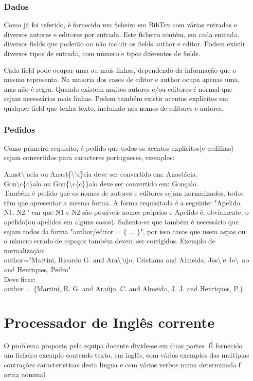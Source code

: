 \documentclass{report}
\begin{document}
\subsubsection{Dados}
Como já foi referido, é fornecido um ficheiro em BibTex com várias entradas 
e diversos autores e editores por entrada. Este ficheiro contém, em 
cada entrada, diversos fields que poderão ou não incluir os fields author 
e editor. Podem existir
diversos tipos de entrada, com número e tipos diferentes de fields.\par
Cada field pode ocupar uma ou mais linhas, dependendo da informação que 
o mesmo representa. Na maioria dos casos de editor
e author ocupa apenas uma, mas não é regra. Quando existem muitos 
autores e/ou editores é normal que sejam necessárias mais linhas. 
Podem também existir acentos explícitos em qualquer field que tenha 
texto, incluindo nos nomes de editores e autores.

\subsubsection{Pedidos}
Como primeiro requisito, é pedido que todos os acentos explícitos(e cedilhas) 
sejam convertidos para caracteres portugueses, exemplos:\par
Anast\textbackslash'acia ou Anast\{\textbackslash'a\}cia deve ser convertido 
em: Anastácia. \\
Gon\textbackslash c\{c\}alo ou Gon\{\textbackslash c\{c\}\}alo deve ser 
convertido em: Gonçalo. \\
Também é pedido que os nomes de autores e editores sejam normalizados, 
todos têm que apresentar a mesma forma.
A forma requisitada é a seguinte: "Apelido, N1. N2." em que N1 e N2 são 
possíveis nomes próprios e Apelido é, obviamente, o apelido(ou apelidos 
em alguns casos). Salienta-se que também é 
necessário que sejam todos da forma
"author/editor = \{ ... \}", por isso casos que usem aspas ou o número errado 
de espaços também devem ser corrigidos. Exemplo de normalização: \\
author="Martini, Ricardo G. and Ara{\textbackslash’u}jo, Cristiana and Almeida, 
Jos{\textbackslash’e} Jo{\textbackslash~a}o and Henriques, Pedro" \\
Deve ficar: \\
author = \{Martini, R. G. and Araújo, C. and Almeida, J. J. and Henriques, P.\}


\section{Processador de Inglês corrente}
O problema proposto pela equipa docente divide-se em duas partes. É fornecido um 
ficheiro exemplo contendo texto, em inglês, com vários exemplos das multiplas 
contrações caracteristicas desta lingua e com vários verbos numa determinada f
orma nominal. 
\end{document}
